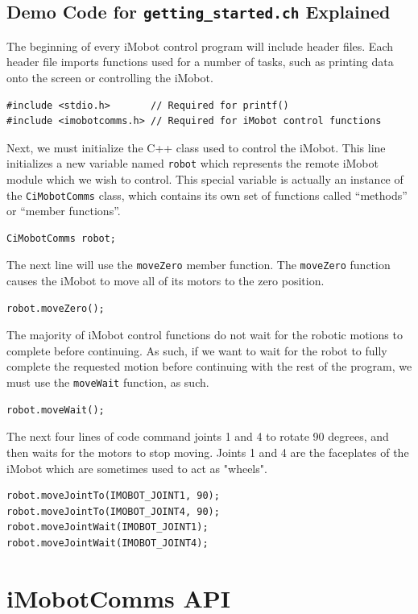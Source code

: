 \documentclass{article}
\begin{document}
\subsection{\label{sec:democode}Demo Code for \texttt{getting\_started.ch} Explained}
The beginning of every iMobot control program will include header files. Each
header file imports functions used for a number of tasks, such as printing
data onto the screen or controlling the iMobot. 

\begin{verbatim}
#include <stdio.h>       // Required for printf()
#include <imobotcomms.h> // Required for iMobot control functions
\end{verbatim}

Next, we must initialize the C++ class used to control the iMobot. This line
initializes a new variable named \texttt{robot} which represents the remote
iMobot module which we wish to control. This special variable is actually an
instance of the \texttt{CiMobotComms} class, which contains its own set of
functions called ``methods'' or ``member functions''.
\begin{verbatim}
CiMobotComms robot;
\end{verbatim}

The next line will use the \texttt{moveZero} member function. The
\texttt{moveZero} function causes the iMobot to move all of its motors to the
zero position.
\begin{verbatim}
robot.moveZero();
\end{verbatim}

The majority of iMobot control functions do not wait for the robotic motions to
complete before continuing. As such, if we want to wait for the robot to fully
complete the requested motion before continuing with the rest of the program,
we must use the \texttt{moveWait} function, as such.
\begin{verbatim}
robot.moveWait();
\end{verbatim}

The next four lines of code command joints 1 and 4 to rotate 90 degrees, and
then waits for the motors to stop moving. Joints 1 and 4 are the faceplates
of the iMobot which are sometimes used to act as "wheels".
\begin{verbatim}
robot.moveJointTo(IMOBOT_JOINT1, 90);
robot.moveJointTo(IMOBOT_JOINT4, 90);
robot.moveJointWait(IMOBOT_JOINT1);
robot.moveJointWait(IMOBOT_JOINT4);
\end{verbatim}

\newpage
\appendix
\section{iMobotComms API}

\end{document}
